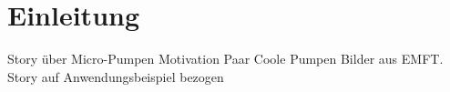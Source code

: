 \chapter{Einleitung}
\label{sec:introduction}

Story über Micro-Pumpen
Motivation
Paar Coole Pumpen Bilder aus EMFT.
Story auf Anwendungsbeispiel bezogen





